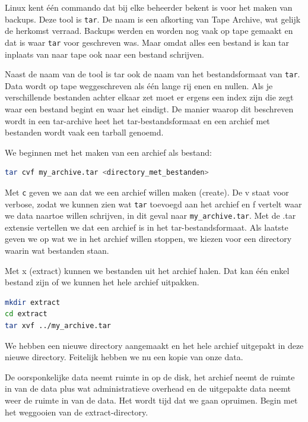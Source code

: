 Linux kent \'e\'en commando dat bij elke beheerder bekent is voor het maken van backups. Deze tool is \texttt{tar}. De naam is een afkorting van Tape Archive, wat gelijk de herkomst verraad. Backups werden en worden nog vaak op tape gemaakt en dat is waar \texttt{tar} voor geschreven was. Maar omdat alles een bestand is kan tar inplaats van naar tape ook naar een bestand schrijven.

Naast de naam van de tool is tar ook de naam van het bestandsformaat van \texttt{tar}. Data wordt op tape weggeschreven als \'e\'en lange rij enen en nullen. Als je verschillende bestanden achter elkaar zet moet er ergens een index zijn die zegt waar een bestand begint en waar het eindigt. De manier waarop dit beschreven wordt in een tar-archive heet het tar-bestandsformaat en een archief met bestanden wordt vaak een tarball genoemd.

We beginnen met het maken van een archief als bestand:
\begin{lstlisting}[language=bash]
tar cvf my_archive.tar <directory_met_bestanden>
\end{lstlisting}

Met \texttt{c} geven we aan dat we een archief willen maken (create). De v staat voor verbose, zodat we kunnen zien wat \texttt{tar} toevoegd aan het archief en f vertelt waar we data naartoe willen schrijven, in dit geval naar \texttt{my\_archive.tar}. Met de .tar extensie vertellen we dat een archief is in het tar-bestandsformaat. Als laatste geven we op wat we in het archief willen stoppen, we kiezen voor een directory waarin wat bestanden staan.

Met x (extract) kunnen we bestanden uit het archief halen. Dat kan \'e\'en enkel bestand zijn of we kunnen het hele archief uitpakken.
\begin{lstlisting}[language=bash]
mkdir extract
cd extract
tar xvf ../my_archive.tar
\end{lstlisting}
We hebben een nieuwe directory aangemaakt en het hele archief uitgepakt in deze nieuwe directory. Feitelijk hebben we nu een kopie van onze data.

De oorsponkelijke data neemt ruimte in op de disk, het archief neemt de ruimte in van de data plus wat administratieve overhead en de uitgepakte data neemt weer de ruimte in van de data. Het wordt tijd dat we gaan opruimen. Begin met het weggooien van de extract-directory.

